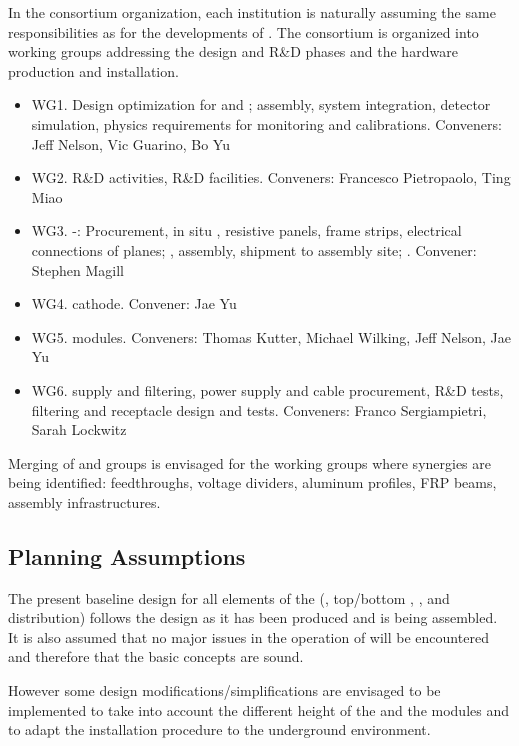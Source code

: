 In the  consortium organization, each institution is naturally assuming the same responsibilities as for the developments of . The consortium is organized into working groups addressing the design and  R\&D phases and the hardware production and installation.

\begin{itemize}
\item WG1. Design optimization for  and ; assembly, system integration, detector simulation, physics requirements for monitoring and calibrations. Conveners: Jeff Nelson, Vic Guarino, Bo Yu
\item WG2. R\&D activities, R\&D facilities. Conveners: Francesco Pietropaolo, Ting Miao
\item WG3. -: Procurement, in situ , resistive panels, frame strips, electrical connections of planes; , assembly, shipment to assembly site; . Convener: Stephen Magill
\item WG4.  cathode. Convener: Jae Yu
\item WG5.  modules. Conveners: Thomas Kutter, Michael Wilking, Jeff Nelson, Jae Yu
\item WG6.  supply and filtering,  power supply and cable procurement, R\&D tests, filtering and receptacle design and tests. Conveners: Franco Sergiampietri, Sarah Lockwitz
\end{itemize}

\noindent Merging of  and  groups is envisaged for the working groups where synergies are being identified:  feedthroughs, voltage dividers, aluminum profiles, FRP beams, assembly infrastructures.

\subsection{Planning Assumptions}
\label{sec:fdsp-hv-org-assmp}
The present baseline design for all elements of the  (, top/bottom , ,  and  distribution) follows the  design as it has been produced and is being assembled.  It is also assumed that no major issues in the  operation of  will be encountered and therefore that the basic  concepts are sound.

However some design modifications/simplifications are envisaged to be implemented to take into account the different height of the   and the  modules and to adapt the installation procedure to the underground environment.

